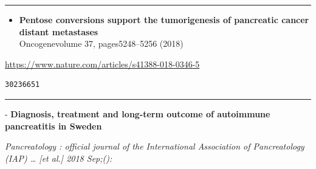 \documentclass[]{article}
\providecommand{\tightlist}{%
  \setlength{\itemsep}{0pt}\setlength{\parskip}{0pt}}
\begin{document}
{}

{}

\begin{center}\rule{0.5\linewidth}{\linethickness}\end{center}

\begin{itemize}
\tightlist
\item
  \textbf{Pentose conversions support the tumorigenesis of pancreatic
  cancer distant metastases}\\
  Oncogenevolume 37, pages5248--5256 (2018)
\end{itemize}

\url{https://www.nature.com/articles/s41388-018-0346-5}

\begin{verbatim}
30236651
\end{verbatim}

\begin{center}\rule{0.5\linewidth}{\linethickness}\end{center}

 - \textbf{Diagnosis, treatment and long-term outcome of autoimmune
pancreatitis in Sweden}

\emph{Pancreatology : official journal of the International Association
of Pancreatology (IAP) \ldots{} {[}et al.{]} 2018 Sep;():}
\end{document}
